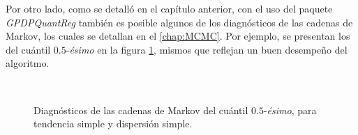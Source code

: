 Por otro lado, como se detall\'o en el cap\'itulo anterior, con el uso del paquete \textit{GPDPQuantReg} tambi\'en es posible algunos de los diagn\'osticos de las cadenas de Markov, los cuales se detallan en el \autoref{chap:MCMC}. Por ejemplo, se presentan los del cu\'antil $0.5$-\textit{\'esimo} en la figura \ref{diag_sgse}, mismos que reflejan un buen desempeño del algoritmo.

\begin{figure}[H]
	\centering
	\caption{Diagn\'osticos de las cadenas de Markov del cu\'antil $0.5$-\textit{\'esimo}, para tendencia simple y dispersi\'on simple.}
	\\
	\label{diag_sgse}
\end{figure}

